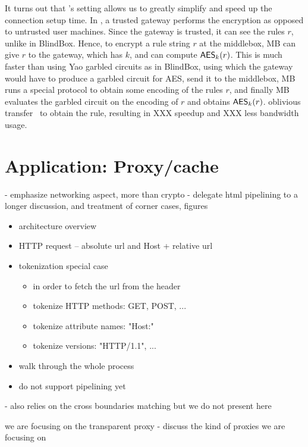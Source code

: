  It turns out that \sys's setting allows us to greatly simplify and speed up the connection setup time. In \sys, a trusted gateway performs the encryption as opposed to untrusted user machines. Since the gateway is trusted, it can see the rules $r$, unlike in BlindBox. Hence, 
to encrypt a rule string $r$ at the middlebox, MB can give $r$ to the gateway, which has $k$, and can compute $\mathsf{AES}_k(r)$. This is much faster than using Yao garbled circuits as in BlindBox, using which the gateway would have to produce a garbled circuit for AES, send it to the middlebox, MB runs a special protocol to obtain some encoding of the rules $r$, and finally MB evaluates the garbled circuit on the encoding of $r$ and obtains $\mathsf{AES}_k(r)$. oblivious transfer~\cite{} to obtain the rule, resulting in XXX speedup and XXX less bandwidth usage. 





\section{Application: Proxy/cache}\label{sec:proxy}


- emphasize networking aspect, more than crypto
- delegate html pipelining to a longer discussion, and treatment of corner cases, figures

\begin{itemize}
\item architecture overview
\item HTTP request -- absolute url and Host + relative url
\item tokenization special case \\
    \begin{itemize}
    \item in order to fetch the url from the header
    \item tokenize HTTP methods: GET, POST, ...
    \item tokenize attribute names: "Host:"
    \item tokenize versions: "HTTP/1.1", ...
    \end{itemize}
\item walk through the whole process
\item do not support pipelining yet
\end{itemize}

- also relies on the cross boundaries matching but we do not present here 

we are focusing on the transparent proxy
- discuss the kind of proxies we are focusing on

